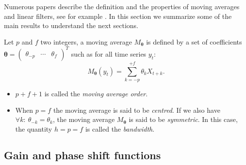 \documentclass[
]{article}
\newcommand\transp[1]{{#1}^T}
\newcommand\1{\mathds{1}}
\begin{document}
Numerous papers describe the definition and the properties of moving
averages and linear filters, see for example \textcite{ch12HBSA}. In
this section we summarize some of the main results to understand the
next sections.

Let \(p\) and \(f\) two integers, a moving average
\(M_{\boldsymbol\theta}\) is defined by a set of coefficients
\(\boldsymbol\theta=\transp{\begin{pmatrix}\theta_{-p}&\cdots&\theta_{f}\end{pmatrix}}\)
such as for all time series \(y_t\): \[
M_{\boldsymbol\theta}(y_t)=\sum_{k=-p}^{+f}\theta_kX_{t+k}.
\]

\begin{itemize}
\item
  \(p+f+1\) is called the \emph{moving average order}.
\item
  When \(p=f\) the moving average is said to be \emph{centred}. If we
  also have \(\forall k:\:\theta_{-k} = \theta_k\), the moving average
  \(M_{\boldsymbol\theta}\) is said to be \emph{symmetric}. In this
  case, the quantity \(h=p=f\) is called the \emph{bandwidth}.
\end{itemize}

\subsection{Gain and phase shift functions}\label{subsec:gain-deph}
\end{document}
